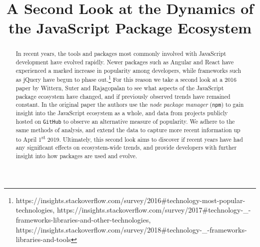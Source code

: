 \documentclass[10pt,conference]{IEEEtran}
\def\code#1{\texttt{#1}}
\begin{document}
\title{A Second Look at the Dynamics of the JavaScript Package Ecosystem\\}

\author{
}

\maketitle

\begin{abstract}
In recent years, the tools and packages most commonly involved with JavaScript development have evolved rapidly.
Newer packages such as Angular and React have experienced a marked increase in popularity among developers, while frameworks such as jQuery
have begun to phase out.\footnote{\label{adoption}https://insights.stackoverflow.com/survey/2016\#technology-most-popular-technologies, 
https://insights.stackoverflow.com/survey/2017\#technology-\_-frameworks-libraries-and-other-technologies, https://insights.stackoverflow.com/survey/2018\#technology-\_-frameworks-libraries-and-tools}
For this reason we take a second look at a 2016 paper by Wittern, Suter and Rajagopalan \cite{Wittern:2016} to see what aspects of the JavaScript package ecosystem have changed, 
and if previously observed trends have remained constant.
In the original paper the authors use the \emph{node package manager} (\code{npm}) to gain 
insight into the JavaScript ecosystem as a whole, and data from projects publicly hosted on \code{GitHub} to observe an alternative measure of popularity. We adhere to the same methods of analysis, and extend the data to capture
more recent information up to April 1\textsuperscript{st} 2019.
Ultimately, this second look aims to discover if recent years have had any significant effects on ecosystem-wide trends, and provide developers with further insight into how packages are used and evolve.
\end{abstract}
\end{document}
